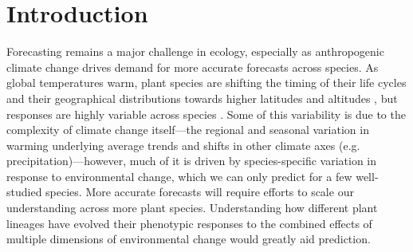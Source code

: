 \documentclass{article}\usepackage[]{graphicx}\usepackage[]{color}
\begin{document}



\section*{Introduction}

Forecasting remains a major challenge in ecology, especially as anthropogenic climate change drives demand for more accurate forecasts across species. As global temperatures warm, plant species are shifting the timing of their life cycles \citep{Cleland:2007or} and their geographical distributions towards higher latitudes and altitudes \citep{chen2011}, but responses are highly variable across species \citep{menzel2020}. Some of this variability is due to the complexity of climate change itself---the regional and seasonal variation in warming underlying average trends and shifts in other climate axes (e.g. precipitation)---however, much of it is driven by species-specific variation in response to environmental change, which we can only predict for a few well-studied species. More accurate forecasts will require efforts to scale our understanding across more plant species. Understanding how different plant lineages have evolved their phenotypic responses to the combined effects of multiple dimensions of environmental change would greatly aid prediction.\\ %
\end{document}
